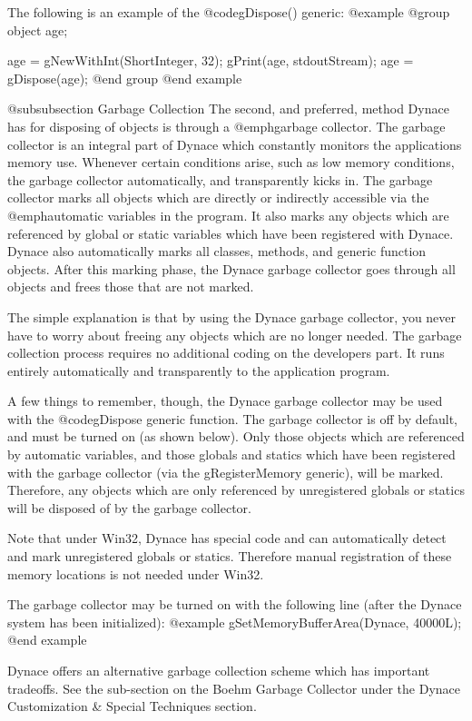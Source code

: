 The following is an example of the @code{gDispose()} generic:
@example
@group
        object    age;

        age = gNewWithInt(ShortInteger, 32);
        gPrint(age, stdoutStream);
        age = gDispose(age);
@end group
@end example

@subsubsection Garbage Collection
The second, and preferred, method Dynace has for disposing of objects is
through a @emph{garbage collector}.  The garbage collector is an
integral part of Dynace which constantly monitors the applications memory
use.  Whenever certain conditions arise, such as low memory conditions,
the garbage collector automatically, and transparently kicks in.  The
garbage collector marks all objects which are directly or indirectly
accessible via the @emph{automatic} variables in the program.  It also
marks any objects which are referenced by global or static variables
which have been registered with Dynace.  Dynace also automatically marks all
classes, methods, and generic function objects.  After this marking
phase, the Dynace garbage collector goes through all objects and frees
those that are not marked.

The simple explanation is that by using the Dynace garbage collector, you
never have to worry about freeing any objects which are no longer
needed.  The garbage collection process requires no additional coding
on the developers part.  It runs entirely automatically and
transparently to the application program.

A few things to remember, though, the Dynace garbage collector may be used
with the @code{gDispose} generic function.  The garbage collector is off
by default, and must be turned on (as shown below).  Only those objects
which are referenced by automatic variables, and those globals and
statics which have been registered with the garbage collector (via the
gRegisterMemory generic), will be marked.  Therefore, any objects which
are only referenced by unregistered globals or statics will be disposed
of by the garbage collector.

Note that under Win32, Dynace has special code and can automatically
detect and mark unregistered globals or statics.  Therefore manual
registration of these memory locations is not needed under Win32.

The garbage collector may be turned on with the following line (after
the Dynace system has been initialized):
@example
        gSetMemoryBufferArea(Dynace, 40000L);
@end example

Dynace offers an alternative garbage collection scheme which has important
tradeoffs.  See the sub-section on the Boehm Garbage Collector under the
Dynace Customization & Special Techniques section.

